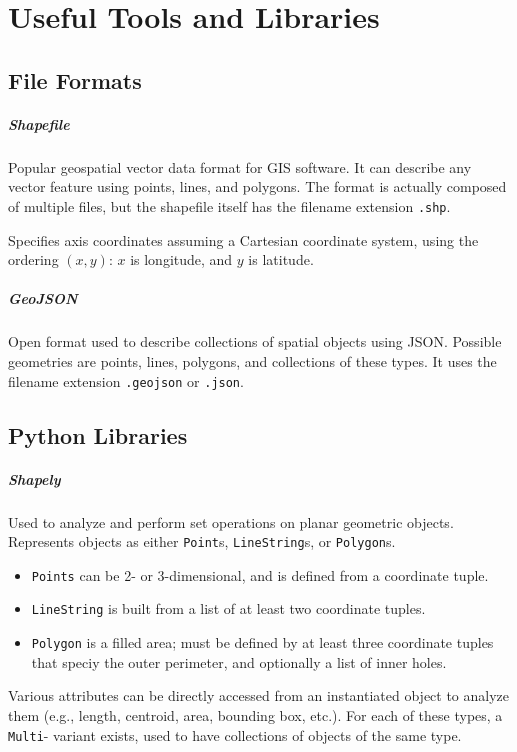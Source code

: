 \titleformat{\paragraph}[runin]{\normalfont\normalsize\bfseries\color{Maroon}}{}{0em}{}

\chapter{Useful Tools and Libraries}

\section{File Formats}
\paragraph{Shapefile}
Popular geospatial vector data format for GIS software. It can describe any vector feature using points, lines, and polygons. The format is actually composed of multiple files, but the shapefile itself has the filename extension \texttt{.shp}.

Specifies axis coordinates assuming a Cartesian coordinate system, using the ordering $(x,y)$: $x$ is longitude, and $y$ is latitude.

\paragraph{GeoJSON}
Open format used to describe collections of spatial objects using JSON. Possible geometries are points, lines, polygons, and collections of these types. It uses the filename extension \texttt{.geojson} or \texttt{.json}.

\section{Python Libraries}
\paragraph{Shapely}
Used to analyze and perform set operations on planar geometric objects. Represents objects as either \texttt{Point}s, \texttt{LineString}s, or \texttt{Polygon}s.
\begin{itemize}[itemsep=-5pt, label=-]
    \item \texttt{Points} can be 2- or 3-dimensional, and is defined from a coordinate tuple.
    \item \texttt{LineString} is built from a list of at least two coordinate tuples.
    \item \texttt{Polygon} is a filled area; must be defined by at least three coordinate tuples that speciy the outer perimeter, and optionally a list of inner holes.
\end{itemize}
Various attributes can be directly accessed from an instantiated object to analyze them (e.g., length, centroid, area, bounding box, etc.). For each of these types, a \texttt{Multi}- variant exists, used to have collections of objects of the same type.


